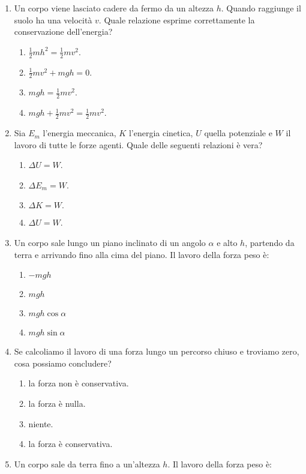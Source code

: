 \documentclass{article}
\begin{document}
\begin{enumerate}
  \item Un corpo viene lasciato cadere da fermo da un altezza $h$. Quando raggiunge il suolo ha una velocità $v$. Quale relazione esprime correttamente la conservazione dell'energia?
  \begin{enumerate}[label=\Alph*.]
    \item $\frac{1}{2}mh^2=\frac{1}{2}mv^2$.
    \item $\frac{1}{2}mv^2+mgh=0.$
    \item $mgh=\frac{1}{2}mv^2$.
    \item $mgh+\frac{1}{2}mv^2=\frac{1}{2}mv^2.$
  \end{enumerate}
  \item Sia $E_m$ l'energia meccanica, $K$ l'energia cinetica, $U$ quella potenziale e $W$ il lavoro di tutte le forze agenti. Quale delle seguenti relazioni è vera?
  \begin{enumerate}[label=\Alph*.]
    \item $\Delta U=W$.
    \item $\Delta E_m=W$.
    \item $\Delta K=W.$
    \item $\Delta U=W$.
  \end{enumerate}
  \item Un corpo sale lungo un piano inclinato di un angolo $\alpha$ e alto $h$, partendo da terra e arrivando fino alla cima del piano. Il lavoro della forza peso è:
  \begin{enumerate}[label=\Alph*.]
    \item $-mgh$
    \item $mgh$
    \item $mgh\cos\alpha$
    \item $mgh\sin\alpha$
  \end{enumerate}
  \item Se calcoliamo il lavoro di una forza lungo un percorso chiuso e troviamo zero, cosa possiamo concludere?
  \begin{enumerate}[label=\Alph*.]
    \item la forza non è conservativa.
    \item la forza è nulla.
    \item niente.
    \item la forza è conservativa.
  \end{enumerate}
  \item Un corpo sale da terra fino a un'altezza $h$. Il lavoro della forza peso è:

\end{enumerate}
\end{document}
